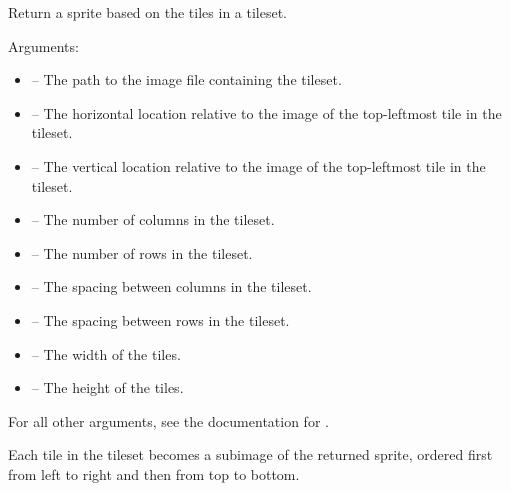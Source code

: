 \documentclass[letterpaper,10pt,english]{sphinxmanual}
\begin{document}
\begin{fulllineitems}
\label{gfx:sge.gfx.Sprite.from_tileset}
Return a sprite based on the tiles in a tileset.

Arguments:
\begin{itemize}
\item {} 
 -- The path to the image file containing the
tileset.

\item {} 
 -- The horizontal location relative to the image of the
top-leftmost tile in the tileset.

\item {} 
 -- The vertical location relative to the image of the
top-leftmost tile in the tileset.

\item {} 
 -- The number of columns in the tileset.

\item {} 
 -- The number of rows in the tileset.

\item {} 
 -- The spacing between columns in the tileset.

\item {} 
 -- The spacing between rows in the tileset.

\item {} 
 -- The width of the tiles.

\item {} 
 -- The height of the tiles.

\end{itemize}

For all other arguments, see the documentation for
{\hyperref[gfx:sge.gfx.Sprite.__init__]{\emph{}}}.

Each tile in the tileset becomes a subimage of the returned
sprite, ordered first from left to right and then from top to
bottom.

\end{fulllineitems}

\end{document}
